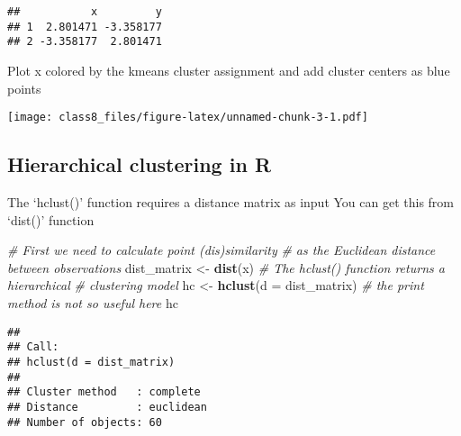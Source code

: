 \documentclass[]{article}
\newenvironment{Shaded}{\begin{snugshade}}{\end{snugshade}}
\newcommand{\KeywordTok}[1]{\textcolor[rgb]{0.13,0.29,0.53}{\textbf{#1}}}
\newcommand{\DataTypeTok}[1]{\textcolor[rgb]{0.13,0.29,0.53}{#1}}
\newcommand{\DecValTok}[1]{\textcolor[rgb]{0.00,0.00,0.81}{#1}}
\newcommand{\StringTok}[1]{\textcolor[rgb]{0.31,0.60,0.02}{#1}}
\newcommand{\CommentTok}[1]{\textcolor[rgb]{0.56,0.35,0.01}{\textit{#1}}}
\newcommand{\OperatorTok}[1]{\textcolor[rgb]{0.81,0.36,0.00}{\textbf{#1}}}
\newcommand{\NormalTok}[1]{#1}
\begin{document}
\begin{Shaded}
\end{Shaded}

\begin{verbatim}
##           x         y
## 1  2.801471 -3.358177
## 2 -3.358177  2.801471
\end{verbatim}

Plot x colored by the kmeans cluster assignment and add cluster centers
as blue points

\begin{Shaded}
\end{Shaded}

\texttt{[image: class8\_files/figure-latex/unnamed-chunk-3-1.pdf]}

\subsection{Hierarchical clustering in
R}\label{hierarchical-clustering-in-r}

The `hclust()' function requires a distance matrix as input You can get
this from `dist()' function

\begin{Shaded}
\begin{Highlighting}[]
\CommentTok{# First we need to calculate point (dis)similarity}
\CommentTok{#   as the Euclidean distance between observations}
\NormalTok{dist_matrix <-}\StringTok{ }\KeywordTok{dist}\NormalTok{(x)}
\CommentTok{# The hclust() function returns a hierarchical}
\CommentTok{#  clustering model}
\NormalTok{hc <-}\StringTok{ }\KeywordTok{hclust}\NormalTok{(}\DataTypeTok{d =}\NormalTok{ dist_matrix)}
\CommentTok{# the print method is not so useful here}
\NormalTok{hc}
\end{Highlighting}
\end{Shaded}

\begin{verbatim}
## 
## Call:
## hclust(d = dist_matrix)
## 
## Cluster method   : complete 
## Distance         : euclidean 
## Number of objects: 60
\end{verbatim}
\end{document}
